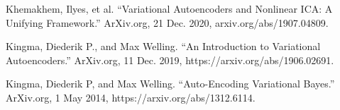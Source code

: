 \begin{thebibliography}{9}
Khemakhem, Ilyes, et al. “Variational Autoencoders and Nonlinear ICA: A Unifying Framework.” ArXiv.org, 21 Dec. 2020, arxiv.org/abs/1907.04809.

Kingma, Diederik P., and Max Welling. “An Introduction to Variational Autoencoders.” ArXiv.org, 11 Dec. 2019, https://arxiv.org/abs/1906.02691.

Kingma, Diederik P, and Max Welling. “Auto-Encoding Variational Bayes.” ArXiv.org, 1 May 2014, https://arxiv.org/abs/1312.6114.
\end{thebibliography}
